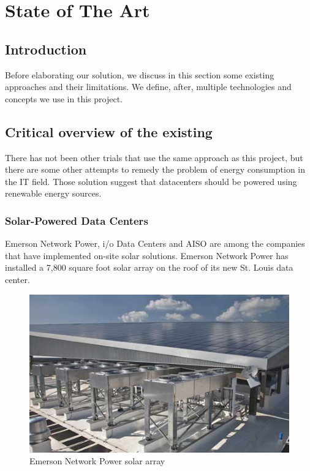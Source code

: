 

\chapter{State of The Art}


\section{Introduction}
    Before elaborating our solution, we discuss in this section some existing approaches and their
    limitations. We define, after, multiple technologies and concepts we use in this project.

\section{Critical overview of the existing}
    There has not been other trials that use the same approach as this project, but there are some other
    attempts to remedy the problem of energy consumption in the IT field. Those solution suggest that
    datacenters should be powered using renewable energy sources.

    \subsection{Solar-Powered Data Centers}
        Emerson Network Power, i/o Data Centers and AISO are among the companies that have implemented on-site
        solar solutions. Emerson Network Power has installed a 7,800 square foot solar array on the roof of its
        new St. Louis data center\cite{emerson-network-power-data-centers}.

        \begin{figure}[!h]\centering
            \includegraphics[width=.4\columnwidth]{3-State-of-the-art/figs/emerson-solar-panels.jpg}
            \caption{Emerson Network Power solar array}
        \end{figure}

